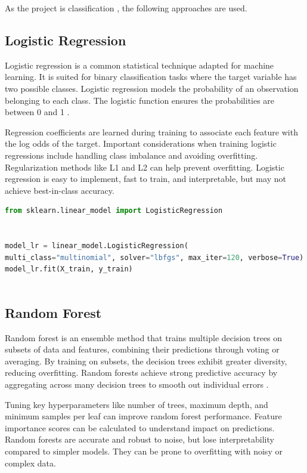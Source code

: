 As the project is classification \cite{osisanwo2017supervised}, the following approaches are used.

\subsection{Logistic Regression}
Logistic regression is a common statistical technique adapted for machine learning. It is suited for binary classification tasks where the target variable has two possible classes. Logistic regression models the probability of an observation belonging to each class. The logistic function ensures the probabilities are between 0 and 1 \cite{hosmer2013applied}.

Regression coefficients are learned during training to associate each feature with the log odds of the target. Important considerations when training logistic regressions include handling class imbalance and avoiding overfitting. Regularization methods like L1 and L2 can help prevent overfitting. Logistic regression is easy to implement, fast to train, and interpretable, but may not achieve best-in-class accuracy.


\begin{lstlisting}[language=Python]
from sklearn.linear_model import LogisticRegression


model_lr = linear_model.LogisticRegression(
multi_class="multinomial", solver="lbfgs", max_iter=120, verbose=True)
model_lr.fit(X_train, y_train)
	
\end{lstlisting}


\subsection{Random Forest}

Random forest is an ensemble method that trains multiple decision trees on subsets of data and features, combining their predictions through voting or averaging. By training on subsets, the decision trees exhibit greater diversity, reducing overfitting. Random forests achieve strong predictive accuracy by aggregating across many decision trees to smooth out individual errors \cite{breiman2001random}.

Tuning key hyperparameters like number of trees, maximum depth, and minimum samples per leaf can improve random forest performance. Feature importance scores can be calculated to understand impact on predictions. Random forests are accurate and robust to noise, but lose interpretability compared to simpler models. They can be prone to overfitting with noisy or complex data.



